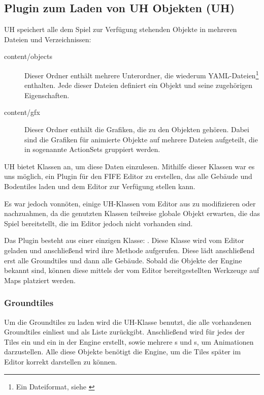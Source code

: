 \subsection{Plugin zum Laden von UH Objekten (UH)}
UH speichert alle dem Spiel zur Verfügung stehenden Objekte in mehreren Dateien
und Verzeichnissen:

\begin{description}
\item[content/objects] Dieser Ordner enthält mehrere Unterordner, die wiederum
YAML-Dateien\footnote{Ein Dateiformat, siehe \cite{yaml}} enthalten. Jede
dieser Dateien definiert ein Objekt und seine zugehörigen Eigenschaften.
\item[content/gfx] Dieser Ordner enthält die Grafiken, die zu den Objekten
gehören. Dabei sind die Grafiken für animierte Objekte auf mehrere Dateien
aufgeteilt, die in sogenannte ActionSets gruppiert werden.
\end{description}

UH bietet Klassen an, um diese Daten einzulesen.
Mithilfe dieser Klassen war es uns möglich, ein
Plugin für den FIFE Editor zu erstellen, das alle Gebäude und Bodentiles
laden und dem Editor zur Verfügung stellen kann.

Es war jedoch vonnöten, einige UH-Klassen vom Editor aus zu
modifizieren oder nachzuahmen, da die genutzten Klassen teilweise
globale Objekt erwarten, die das Spiel bereitstellt, die im Editor
jedoch nicht vorhanden sind.

Das Plugin besteht aus einer einzigen Klasse: . Diese
Klasse wird vom Editor geladen und anschließend wird ihre  Methode
aufgerufen. Diese lädt anschließend erst alle Groundtiles und dann alle Gebäude.
Sobald die Objekte der Engine bekannt sind, können diese mittels der vom Editor
bereitgestellten Werkzeuge auf Maps platziert werden.

\subsubsection{Groundtiles}
Um die Groundtiles zu laden wird die UH-Klasse  benutzt,
die alle vorhandenen Groundtiles einliest und als Liste zurückgibt. Anschließend
wird für jedes der Tiles ein  und ein  in der
Engine erstellt, sowie mehrere s und s, um Animationen darzustellen.
Alle diese Objekte benötigt die Engine, um die Tiles später im Editor korrekt
darstellen zu können.

